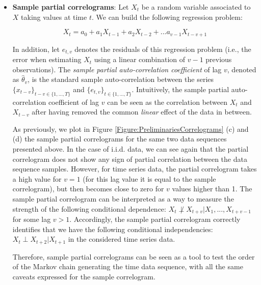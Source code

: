 \begin{itemize}
\item \textbf{Sample partial correlograms}: Let $X_t$ be a random variable associated to $X$ taking values at time $t$. We can build the following regression problem:

$$ X_t = a_0 + a_1X_{t-1} + a_2X_{t-2} + ... a_{v-1}X_{t-v+1}$$

In addition, let $e_{t,v}$ denotes the residuals of this regression problem (i.e., the error when estimating $X_t$ using a linear combination of $v-1$ previous observations). The \emph{sample partial auto-correlation coefficient} of lag $v$, denoted as  $\hat{\theta}_v$, is the standard sample auto-correlation between the series $\{x_{t-v}\}_{t-v\in\{1,...,T\}}$ and $\{e_{t,v}\}_{t\in\{1,...,T\}}$. Intuitively, the sample partial auto-correlation coefficient of lag $v$ can be seen as the correlation between $X_t$ and $X_{t-v}$ after having removed the common \emph{linear} effect of the data in between.

As previously, we plot in Figure \ref{Figure:PreliminariesCorrelograms} (c) and (d) the sample partial correlograms for the same two data sequences presented above. In the case of i.i.d. data, we can see again that the partial correlogram does not show any sign of partial correlation between the data sequence samples. However, for time series data, the partial correlogram takes a high value for $v=1$ (for this lag value it is equal to the sample correlogram), but then becomes close to zero for $v$ values higher than 1. The sample partial correlogram can be interpreted as a way to measure the strength of the following conditional dependence: $X_t  \not\perp X_{t+v} | X_1,...,X_{t+v-1}$ for some lag $v>1$. Accordingly, the sample partial correlogram correctly identifies that we have the following conditional independencies: $X_t\perp X_{t+2}|X_{t+1}$ in the considered time series data. 

Therefore, sample partial correlograms can be seen as a tool to test the order of the Markov chain generating the time data sequence, with all the same caveats expressed for the sample correlogram. 


\end{itemize}
